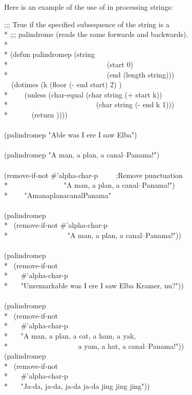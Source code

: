 \begin{defmac}
Here is an example of the use of  in processing strings:
\begin{lisp}
;;; True if the specified subsequence of the string is a \\*
;;; palindrome (reads the same forwards and backwards). \\*
\\*
(defun palindromep (string  \\*
~~~~~~~~~~~~~~~~~~~~~~~~~~~(start 0) \\*
~~~~~~~~~~~~~~~~~~~~~~~~~~~(end (length string))) \\
~~(dotimes (k (floor (- end start) 2) {\true}) \\*
~~~~(unless (char-equal (char string (+ start k)) \\*
~~~~~~~~~~~~~~~~~~~~~~~~(char string (- end k 1))) \\*
~~~~~~(return {\false})))) \\
\\
(palindromep "Able was I ere I saw Elba") \EV\ {\true} \\
 \\
(palindromep "A man, a plan, a canal--Panama!") \EV\ {\false} \\
 \\
(remove-if-not \#'alpha-char-p~~~~~;{\rm Remove punctuation} \\*
~~~~~~~~~~~~~~~"A man, a plan, a canal--Panama!") \\*
~~~\EV\ "AmanaplanacanalPanama" \\
 \\
(palindromep \\*
~(remove-if-not \#'alpha-char-p \\*
~~~~~~~~~~~~~~~~"A man, a plan, a canal--Panama!")) \EV\ {\true} \\
 \\
(palindromep \\*
~(remove-if-not \\*
~~~\#'alpha-char-p \\*
~~~"Unremarkable was I ere I saw Elba Kramer, nu?")) \EV\ {\true} \\
 \\
(palindromep \\*
~(remove-if-not \\*
~~~\#'alpha-char-p \\*
~~~"A man, a plan, a cat, a ham, a yak, \\*
~~~~~~~~~~~~~~~~~~~a yam, a hat, a canal--Panama!")) \EV\ {\true}
\\
(palindromep \\*
~(remove-if-not \\*
~~~\#'alpha-char-p \\*
~~~"Ja-da, ja-da, ja-da ja-da jing jing jing")) \EV\ {\false}
\end{lisp}


\end{defmac}
